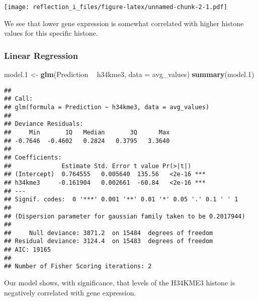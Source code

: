 \documentclass[]{article}
\newenvironment{Shaded}{\begin{snugshade}}{\end{snugshade}}
\newcommand{\DataTypeTok}[1]{\textcolor[rgb]{0.13,0.29,0.53}{#1}}
\newcommand{\FloatTok}[1]{\textcolor[rgb]{0.00,0.00,0.81}{#1}}
\newcommand{\KeywordTok}[1]{\textcolor[rgb]{0.13,0.29,0.53}{\textbf{#1}}}
\newcommand{\NormalTok}[1]{#1}
\newcommand{\OperatorTok}[1]{\textcolor[rgb]{0.81,0.36,0.00}{\textbf{#1}}}
\newcommand{\StringTok}[1]{\textcolor[rgb]{0.31,0.60,0.02}{#1}}
\begin{document}
\begin{Shaded}
\end{Shaded}

\texttt{[image: reflection\_i\_files/figure-latex/unnamed-chunk-2-1.pdf]}

We see that lower gene expression is somewhat correlated with higher
histone values for this specific histone.

\hypertarget{linear-regression}{%
\subsubsection{Linear Regression}\label{linear-regression}}

\begin{Shaded}
\begin{Highlighting}[]
\NormalTok{model}\FloatTok{.1}\NormalTok{ <-}\StringTok{ }\KeywordTok{glm}\NormalTok{(Prediction }\OperatorTok{~}\StringTok{ }\NormalTok{h34kme3, }\DataTypeTok{data =}\NormalTok{ avg_values)}
\KeywordTok{summary}\NormalTok{(model}\FloatTok{.1}\NormalTok{)}
\end{Highlighting}
\end{Shaded}

\begin{verbatim}
## 
## Call:
## glm(formula = Prediction ~ h34kme3, data = avg_values)
## 
## Deviance Residuals: 
##     Min       1Q   Median       3Q      Max  
## -0.7646  -0.4602   0.2824   0.3795   3.3640  
## 
## Coefficients:
##              Estimate Std. Error t value Pr(>|t|)    
## (Intercept)  0.764555   0.005640  135.56   <2e-16 ***
## h34kme3     -0.161904   0.002661  -60.84   <2e-16 ***
## ---
## Signif. codes:  0 '***' 0.001 '**' 0.01 '*' 0.05 '.' 0.1 ' ' 1
## 
## (Dispersion parameter for gaussian family taken to be 0.2017944)
## 
##     Null deviance: 3871.2  on 15484  degrees of freedom
## Residual deviance: 3124.4  on 15483  degrees of freedom
## AIC: 19165
## 
## Number of Fisher Scoring iterations: 2
\end{verbatim}

Our model shows, with significance, that levels of the H34KME3 histone
is negatively correlated with gene expression.
\end{document}
